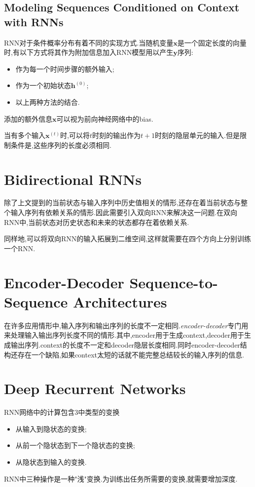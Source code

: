 \subsection{Modeling Sequences Conditioned on Context with RNNs}

RNN对于条件概率分布有着不同的实现方式.当随机变量$\mathbf x$是一个固定长度的向量时,有以下方式将其作为附加信息加入RNN模型用以产生$\mathbf y$序列:
\begin{itemize}
    \item 作为每一个时间步骤的额外输入;
    \item 作为一个初始状态$\mathbf h^{(0)}$;
    \item 以上两种方法的结合.
\end{itemize}
添加的额外信息$\mathbf x$可以视为前向神经网络中的bias.

当有多个输入$\mathbf x^{(t)}$时,可以将$t$时刻的输出作为$t+1$时刻的隐层单元的输入.但是限制条件是,这些序列的长度必须相同.

\section{Bidirectional RNNs}

除了上文提到的当前状态与输入序列中历史值相关的情形,还存在着当前状态与整个输入序列有依赖关系的情形.因此需要引入双向RNN来解决这一问题.在双向RNN中,当前状态对历史状态和未来的状态都存在着依赖关系.

同样地,可以将双向RNN的输入拓展到二维空间,这样就需要在四个方向上分别训练一个RNN.

\section{Encoder-Decoder Sequence-to-Sequence Architectures}

在许多应用情形中,输入序列和输出序列的长度不一定相同.\textit{encoder-decoder}专门用来处理输入输出序列长度不同的情形.其中,encoder用于生成context,decoder用于生成输出序列.context的长度不一定和decoder隐层长度相同.同时encoder-decoder结构还存在一个缺陷,如果context太短的话就不能完整总结较长的输入序列的信息.

\section{Deep Recurrent Networks}

RNN网络中的计算包含3中类型的变换
\begin{itemize}
    \item 从输入到隐状态的变换;
    \item 从前一个隐状态到下一个隐状态的变换;
    \item 从隐状态到输入的变换.
\end{itemize}
RNN中三种操作是一种"浅"变换.为训练出任务所需要的变换,就需要增加深度.

